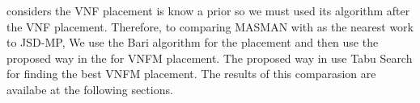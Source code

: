 \cite{AbuLebdeh2017} considers the VNF placement is know a prior so we must used its algorithm after the VNF placement.
Therefore, to comparing MASMAN with \cite{AbuLebdeh2017} as the nearest work to JSD-MP,
We use the Bari \cite{Bari2015} algorithm for the placement and then use the proposed way in the \cite{AbuLebdeh2017} for VNFM placement.
The proposed way in \cite{AbuLebdeh2017} use Tabu Search for finding the best VNFM placement.
The results of this comparasion are availabe at the following sections.


